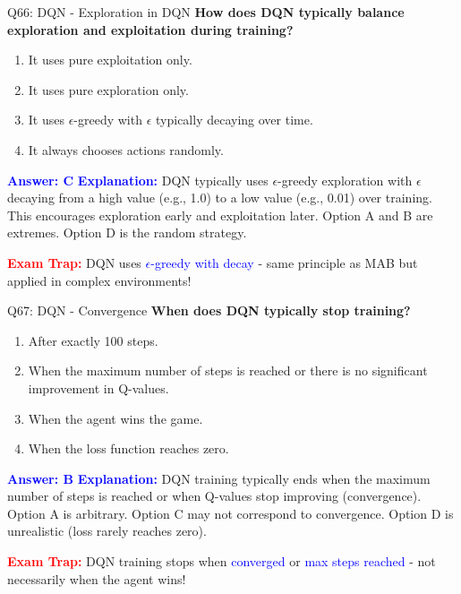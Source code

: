 \documentclass[8pt]{beamer}
\begin{document}
	\begin{frame}{Q66: DQN - Exploration in DQN}
		\fontsize{6.5}{7.5}\selectfont
		\textbf{How does DQN typically balance exploration and exploitation during training?}
		
		\begin{enumerate}
			\item It uses pure exploitation only.
			\item It uses pure exploration only.
			\item It uses $\epsilon$-greedy with $\epsilon$ typically decaying over time.
			\item It always chooses actions randomly.
		\end{enumerate}
		
		\vspace{0.1cm}
		\textcolor{blue}{\textbf{Answer: C}}
		\vspace{0.1cm}
		\textcolor{blue}{\textbf{Explanation:}} DQN typically uses $\epsilon$-greedy exploration with $\epsilon$ decaying from a high value (e.g., 1.0) to a low value (e.g., 0.01) over training. This encourages exploration early and exploitation later. Option A and B are extremes. Option D is the random strategy.
		
		\textcolor{red}{\textbf{Exam Trap:}} DQN uses \textcolor{blue}{$\epsilon$-greedy with decay} - same principle as MAB but applied in complex environments!
	\end{frame}
	
	\begin{frame}{Q67: DQN - Convergence}
		\fontsize{6.5}{7.5}\selectfont
		\textbf{When does DQN typically stop training?}
		
		\begin{enumerate}
			\item After exactly 100 steps.
			\item When the maximum number of steps is reached or there is no significant improvement in Q-values.
			\item When the agent wins the game.
			\item When the loss function reaches zero.
		\end{enumerate}
		
		\vspace{0.1cm}
		\textcolor{blue}{\textbf{Answer: B}}
		\vspace{0.1cm}
		\textcolor{blue}{\textbf{Explanation:}} DQN training typically ends when the maximum number of steps is reached or when Q-values stop improving (convergence). Option A is arbitrary. Option C may not correspond to convergence. Option D is unrealistic (loss rarely reaches zero).
		
		\textcolor{red}{\textbf{Exam Trap:}} DQN training stops when \textcolor{blue}{converged} or \textcolor{blue}{max steps reached} - not necessarily when the agent wins!
	\end{frame}
	
\end{document}
